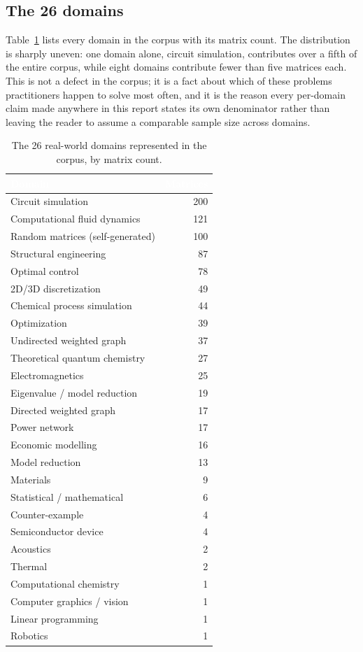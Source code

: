 \documentclass[11pt,a4paper]{article}
\newcommand{\hdrow}{\rowcolor{SBnavy}}
\newcommand{\hdtxt}[1]{\textcolor{white}{\bfseries #1}}
\begin{document}
\subsection{The 26 domains}
\label{sec:datasets-domains}

Table~\ref{tab:domains} lists every domain in the corpus with its matrix count. The
distribution is sharply uneven: one domain alone, circuit simulation, contributes over a
fifth of the entire corpus, while eight domains contribute fewer than five matrices each.
This is not a defect in the corpus; it is a fact about which of these problems
practitioners happen to solve most often, and it is the reason every per-domain claim
made anywhere in this report states its own denominator rather than leaving the reader to
assume a comparable sample size across domains.

\begin{table}[H]
\centering
\caption{The 26 real-world domains represented in the corpus, by matrix count.}
\label{tab:domains}
\small
\begin{tabular}{lr}
\toprule
\hdrow \hdtxt{Domain} & \hdtxt{Matrices} \\
\midrule
Circuit simulation & 200 \\
\rowcolor{SBlight} Computational fluid dynamics & 121 \\
Random matrices (self-generated) & 100 \\
\rowcolor{SBlight} Structural engineering & 87 \\
Optimal control & 78 \\
\rowcolor{SBlight} 2D/3D discretization & 49 \\
Chemical process simulation & 44 \\
\rowcolor{SBlight} Optimization & 39 \\
Undirected weighted graph & 37 \\
\rowcolor{SBlight} Theoretical quantum chemistry & 27 \\
Electromagnetics & 25 \\
\rowcolor{SBlight} Eigenvalue / model reduction & 19 \\
Directed weighted graph & 17 \\
\rowcolor{SBlight} Power network & 17 \\
Economic modelling & 16 \\
\rowcolor{SBlight} Model reduction & 13 \\
Materials & 9 \\
\rowcolor{SBlight} Statistical / mathematical & 6 \\
Counter-example & 4 \\
\rowcolor{SBlight} Semiconductor device & 4 \\
Acoustics & 2 \\
\rowcolor{SBlight} Thermal & 2 \\
Computational chemistry & 1 \\
\rowcolor{SBlight} Computer graphics / vision & 1 \\
Linear programming & 1 \\
\rowcolor{SBlight} Robotics & 1 \\
\bottomrule
\end{tabular}
\end{table}
\end{document}
